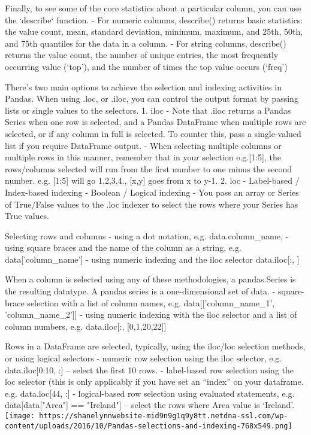 \documentclass[11pt]{article}
\makeatletter
\def\maxwidth{\ifdim\Gin@nat@width>\linewidth\linewidth
    \else\Gin@nat@width\fi}
\let\Oldincludegraphics\includegraphics
\renewcommand{\includegraphics}[1]{\Oldincludegraphics[width=.8\maxwidth]{#1}}
\makeatother
\begin{document}
Finally, to see some of the core statistics about a particular column,
you can use the `describe` function. - For numeric columns, describe()
returns basic statistics: the value count, mean, standard deviation,
minimum, maximum, and 25th, 50th, and 75th quantiles for the data in a
column. - For string columns, describe() returns the value count, the
number of unique entries, the most frequently occurring value (`top'),
and the number of times the top value occurs (`freq')

There's two main options to achieve the selection and indexing
activities in Pandas. When using .loc, or .iloc, you can control the
output format by passing lists or single values to the selectors. 1.
iloc - Note that .iloc returns a Pandas Series when one row is selected,
and a Pandas DataFrame when multiple rows are selected, or if any column
in full is selected. To counter this, pass a single-valued list if you
require DataFrame output. - When selecting multiple columns or multiple
rows in this manner, remember that in your selection e.g.{[}1:5{]}, the
rows/columns selected will run from the first number to one minus the
second number. e.g. {[}1:5{]} will go 1,2,3,4., {[}x,y{]} goes from x to
y-1. 2. loc - Label-based / Index-based indexing - Boolean / Logical
indexing - You pass an array or Series of True/False values to the .loc
indexer to select the rows where your Series has True values.

Selecting rows and columns - using a dot notation, e.g.
data.column\_name, - using square braces and the name of the column as a
string, e.g. data{[}'column\_name'{]} - using numeric indexing and the
iloc selector data.iloc{[}:, {]}

When a column is selected using any of these methodologies, a
pandas.Series is the resulting datatype. A pandas series is a
one-dimensional set of data. - square-brace selection with a list of
column names, e.g. data{[}{[}'column\_name\_1', 'column\_name\_2'{]}{]}
- using numeric indexing with the iloc selector and a list of column
numbers, e.g. data.iloc{[}:, {[}0,1,20,22{]}{]}

Rows in a DataFrame are selected, typically, using the iloc/loc
selection methods, or using logical selectors - numeric row selection
using the iloc selector, e.g. data.iloc{[}0:10, :{]} -- select the first
10 rows. - label-based row selection using the loc selector (this is
only applicably if you have set an ``index'' on your dataframe. e.g.
data.loc{[}44, :{]} - logical-based row selection using evaluated
statements, e.g. data{[}data{[}"Area"{]} == "Ireland"{]} -- select the
rows where Area value is `Ireland'.
\texttt{[image: https://shanelynnwebsite-mid9n9g1q9y8tt.netdna-ssl.com/wp-content/uploads/2016/10/Pandas-selections-and-indexing-768x549.png]}
\end{document}
